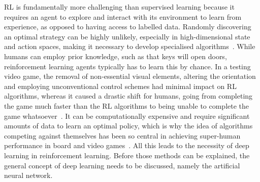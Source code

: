 RL is fundamentally more challenging than supervised learning because it requires an agent to explore and interact with its environment to learn from experience, as opposed to having access to labelled data.
Randomly discovering an optimal strategy can be highly unlikely, especially in high-dimensional state and action spaces, making it necessary to develop specialised algorithms~\autocite{sutton2018}.
While humans can employ prior knowledge, such as that keys will open doors, reinforcement learning agents typically has to learn this by chance.
In a testing video game, the removal of non-essential visual elements, altering the orientation and employing unconventional control schemes had minimal impact on RL algorithms, whereas it caused a drastic shift for humans, going from completing the game much faster than the RL algorithms to being unable to complete the game whatsoever~\autocite{dubey2018}.
It can be computationally expensive and require significant amounts of data to learn an optimal policy, which is why the idea of algorithms competing against themselves has been so central in achieving super-human performance in board and video games~\autocite{silver2016}.
All this leads to the necessity of deep learning in reinforcement learning.
Before those methods can be explained, the general concept of deep learning needs to be discussed, namely the artificial neural network.